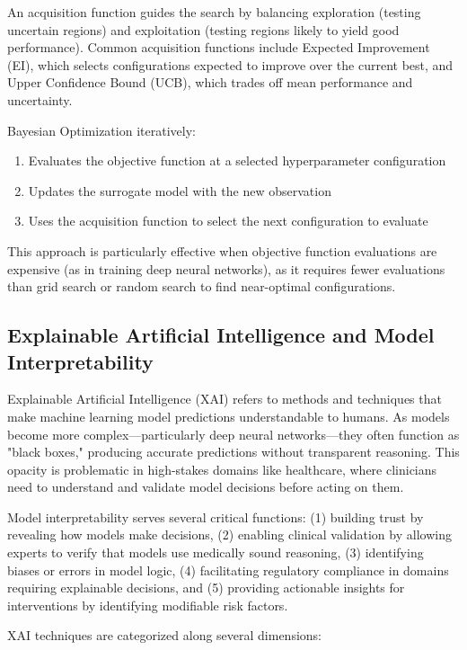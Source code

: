 An acquisition function guides the search by balancing exploration (testing uncertain regions) and exploitation (testing regions likely to yield good performance). Common acquisition functions include Expected Improvement (EI), which selects configurations expected to improve over the current best, and Upper Confidence Bound (UCB), which trades off mean performance and uncertainty.

Bayesian Optimization iteratively:
\begin{enumerate}
    \item Evaluates the objective function at a selected hyperparameter configuration
    \item Updates the surrogate model with the new observation
    \item Uses the acquisition function to select the next configuration to evaluate
\end{enumerate}

This approach is particularly effective when objective function evaluations are expensive (as in training deep neural networks), as it requires fewer evaluations than grid search or random search to find near-optimal configurations.

\subsection{Explainable Artificial Intelligence and Model Interpretability}

Explainable Artificial Intelligence (XAI) refers to methods and techniques that make machine learning model predictions understandable to humans. As models become more complex—particularly deep neural networks—they often function as "black boxes," producing accurate predictions without transparent reasoning. This opacity is problematic in high-stakes domains like healthcare, where clinicians need to understand and validate model decisions before acting on them.

Model interpretability serves several critical functions: (1) building trust by revealing how models make decisions, (2) enabling clinical validation by allowing experts to verify that models use medically sound reasoning, (3) identifying biases or errors in model logic, (4) facilitating regulatory compliance in domains requiring explainable decisions, and (5) providing actionable insights for interventions by identifying modifiable risk factors.

XAI techniques are categorized along several dimensions:


